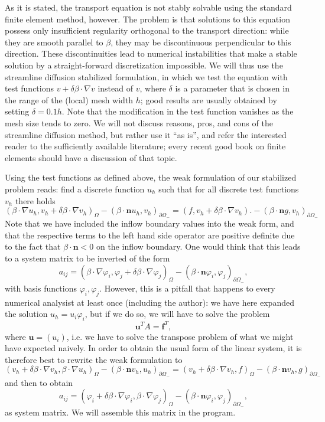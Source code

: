 \documentclass{article}
\renewcommand{\vec}[1]{{\mathbf #1}}
\begin{document}
As it is stated, the transport equation is not stably solvable using
the standard finite element method, however. The problem is that
solutions to this equation possess only insufficient regularity
orthogonal to the transport direction: while they are smooth parallel
to $\beta$, they may be discontinuous perpendicular to this
direction. These discontinuities lead to numerical instabilities that
make a stable solution by a straight-forward discretization
impossible. We will thus use the streamline diffusion stabilized
formulation, in which we test the equation with test functions $v +
\delta \beta\cdot\nabla v$ instead of $v$, where $\delta$ is a
parameter that is chosen in the range of the (local) mesh width $h$;
good results are usually obtained by setting $\delta=0.1h$. Note that
the modification in the test function vanishes as the mesh size tends
to zero. We will not discuss reasons, pros, and cons of the streamline
diffusion method, but rather use it ``as is'', and refer the
interested reader to the sufficiently available literature; every
recent good book on finite elements should have a discussion of that
topic.

Using the test functions as defined above, the weak formulation of
our stabilized problem reads: find a discrete function $u_h$ such that
for all discrete test functions $v_h$ there holds
$$
  (\beta \cdot \nabla u_h, v_h + \delta \beta\cdot\nabla v_h)_\Omega
  -
  (\beta\cdot \vec n u_h, v_h)_{\partial\Omega_-}
  =
  (f, v_h + \delta \beta\cdot\nabla v_h).
  -
  (\beta\cdot \vec n g, v_h)_{\partial\Omega_-}
$$
Note that we have included the inflow boundary values into the weak
form, and that the respective terms to the left hand side operator are
positive definite due to the fact that $\beta\cdot\vec n<0$ on the
inflow boundary. One would think that this leads to a system matrix
to be inverted of the form
$$
  a_{ij} =
  (\beta \cdot \nabla \varphi_i,
   \varphi_j + \delta \beta\cdot\nabla \varphi_j)_\Omega
  -
  (\beta\cdot \vec n \varphi_i, \varphi_j)_{\partial\Omega_-},
$$
with basis functions $\varphi_i,\varphi_j$.  However, this is a
pitfall that happens to every numerical analysist at least once
(including the author): we have here expanded the solution
$u_h = u_i \varphi_i$, but if we do so, we will have to solve the 
problem 
$$
  \vec u^T A = \vec f^T,
$$
where $\vec u=(u_i)$, i.e. we have to solve the transpose problem of
what we might have expected naively. In order to obtain the usual form
of the linear system, it is therefore best to rewrite the weak
formulation to
$$
  (v_h + \delta \beta\cdot\nabla v_h, \beta \cdot \nabla u_h)_\Omega
  -
  (\beta\cdot \vec n v_h, u_h)_{\partial\Omega_-}
  =
  (v_h + \delta \beta\cdot\nabla v_h, f)_\Omega
  -
  (\beta\cdot \vec n v_h, g)_{\partial\Omega_-}
$$
and then to obtain
$$
  a_{ij} =
  (\varphi_i + \delta \beta \cdot \nabla \varphi_i,
   \beta\cdot\nabla \varphi_j)_\Omega
  -
  (\beta\cdot \vec n \varphi_i, \varphi_j)_{\partial\Omega_-},
$$
as system matrix. We will assemble this matrix in the program.
\end{document}
